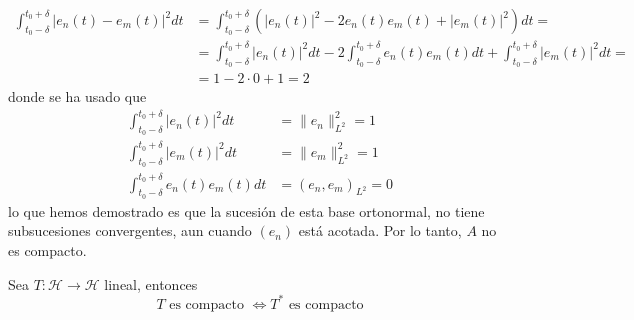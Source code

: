 \begin{ejercicio}
\begin{align*}
        \int_{t_0 - \delta}^{t_0 + \delta} |e_n(t) - e_m(t)|^2 dt &=\int_{t_0 - \delta}^{t_0 + \delta} \left( |e_n(t)|^2 - 2e_n(t)e_m(t) + |e_m(t)|^2 \right) dt = \\
        &=\int_{t_0 - \delta}^{t_0 + \delta} |e_n(t)|^2 dt - 2\int_{t_0 - \delta}^{t_0 + \delta} e_n(t)e_m(t) dt+ \int_{t_0 - \delta}^{t_0 + \delta} |e_m(t)|^2 dt= \\
        &=1-2\cdot 0+1=2
    \end{align*}
    donde se ha usado que 
    \begin{align*}
        \int_{t_0 - \delta}^{t_0 + \delta} |e_n(t)|^2 dt &= \|e_n\|_{L^2}^2 = 1 \\
        \int_{t_0 - \delta}^{t_0 + \delta} |e_m(t)|^2 dt &= \|e_m\|_{L^2}^2 = 1 \\
        \int_{t_0 - \delta}^{t_0 + \delta} e_n(t)e_m(t) dt &= (e_n, e_m)_{L^2} = 0
    \end{align*}
    lo que hemos demostrado es que la sucesión de esta base ortonormal, no tiene subsucesiones convergentes, aun cuando $(e_n)$ está acotada. Por lo tanto, $A$ no es compacto.
\end{ejercicio}

\begin{ejercicio}
    Sea $T: \mathcal{H} \longrightarrow \mathcal{H}$ lineal, entonces
    \begin{equation*}
        T \text{ es compacto } \iff T^* \text{ es compacto}
    \end{equation*}
\end{ejercicio}




